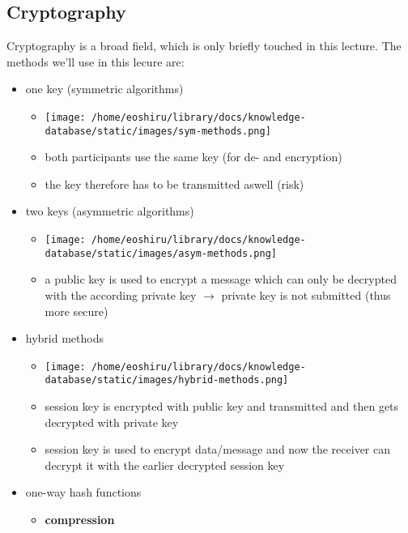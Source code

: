 \documentclass[11pt]{article}
\begin{document}
\subsection{Cryptography}
\label{sec:org047ce5f}
Cryptography is a broad field, which is only briefly touched in this lecture. The methods we'll use in this lecure are:
\begin{itemize}
\item one key (symmetric algorithms)
\begin{itemize}
\item \begin{center}
\texttt{[image: /home/eoshiru/library/docs/knowledge-database/static/images/sym-methods.png]}
\end{center}
\item both participants use the same key (for de- and encryption)
\item the key therefore has to be transmitted aswell (risk)
\end{itemize}
\item two keys (asymmetric algorithms)
\begin{itemize}
\item \begin{center}
\texttt{[image: /home/eoshiru/library/docs/knowledge-database/static/images/asym-methods.png]}
\end{center}
\item a public key is used to encrypt a message which can only be decrypted with the according private key \(\rightarrow\) private key is not submitted (thus more secure)
\end{itemize}
\item hybrid methods
\begin{itemize}
\item \begin{center}
\texttt{[image: /home/eoshiru/library/docs/knowledge-database/static/images/hybrid-methods.png]}
\end{center}
\item session key is encrypted with public key and transmitted and then gets decrypted with private key
\item session key is used to encrypt data/message and now the receiver can decrypt it with the earlier decrypted session key
\end{itemize}
\item one-way hash functions
\begin{itemize}
\item \textbf{compression}

\end{itemize}
\end{itemize}
\end{document}
